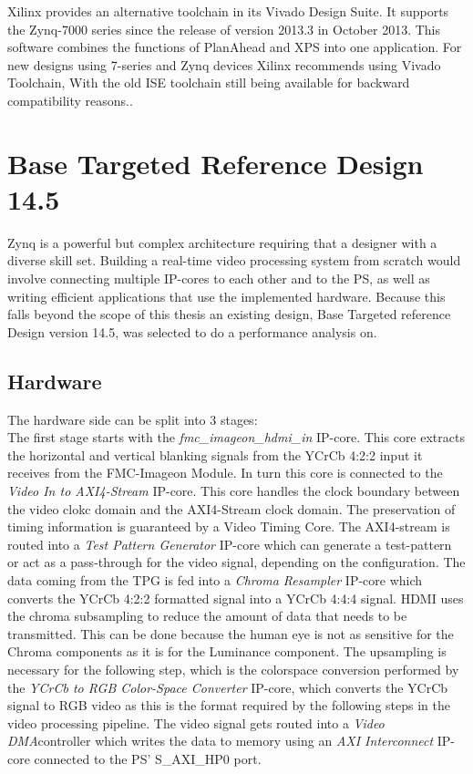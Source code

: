 Xilinx provides an alternative toolchain in its Vivado Design Suite. It supports the Zynq-7000 series since the release of version 2013.3 in October 2013. This software combines the functions of PlanAhead and XPS into one application. For new designs using 7-series and Zynq devices Xilinx recommends using Vivado Toolchain, With the old ISE toolchain still being available for backward compatibility reasons.\cite{isereleasenotes}.


\section{Base Targeted Reference Design 14.5}
Zynq is a powerful but complex architecture requiring that a designer with a diverse skill set. Building a real-time video processing system from scratch would involve connecting multiple IP-cores to each other and to the PS, as well as writing efficient applications that use the implemented hardware. Because this falls beyond the scope of this thesis an existing design, Base Targeted reference Design version 14.5, was selected to do a performance analysis on.

\subsection{Hardware}
The hardware side can be split into 3 stages:\\ 

The first stage starts with the \emph{fmc\_imageon\_hdmi\_in} IP-core. This core extracts the horizontal and vertical blanking signals from the YCrCb 4:2:2 input it receives from the FMC-Imageon Module. In turn this core is connected to the \emph{Video In to AXI4-Stream} IP-core. This core handles the clock boundary between the video clokc domain and the AXI4-Stream clock domain. The preservation of timing information is guaranteed by a Video Timing Core. The AXI4-stream is routed into a \emph{Test Pattern Generator} IP-core which can generate a test-pattern or act as a pass-through for the video signal, depending on the configuration. The data coming from the TPG is fed into a \emph{Chroma Resampler} IP-core which converts the YCrCb 4:2:2 formatted signal into a YCrCb 4:4:4 signal. HDMI uses the chroma subsampling to reduce the amount of data that needs to be transmitted. This can be done because the human eye is not as sensitive for the Chroma components as it is for the Luminance component. The upsampling is necessary for the following step, which is the colorspace conversion performed by the \emph{YCrCb to RGB Color-Space Converter} IP-core, which converts the YCrCb signal to RGB video as this is the format required by the following steps in the video processing pipeline. The video signal gets routed into a \emph{Video DMA}controller which writes the data to memory using an \emph{AXI Interconnect} IP-core connected to the PS' S\_AXI\_HP0 port.\\

